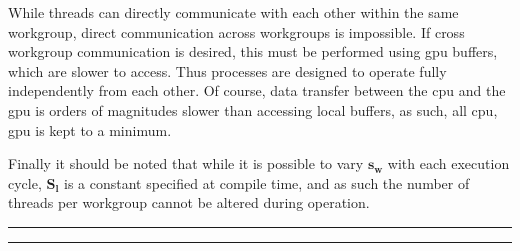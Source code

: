     While threads can directly communicate with each other within the same workgroup, direct communication across workgroups is
    impossible. If cross workgroup communication is desired, this must be performed using \ac{gpu} buffers, which are slower to access. Thus processes are
    designed to operate fully independently from each other. Of course, data transfer between the \ac{cpu} and the \ac{gpu} is orders of magnitudes
    slower than accessing local buffers, as such, all \ac{cpu}, \ac{gpu} is kept to a minimum.
    
    Finally it should be noted that while it is possible to vary \(\bm{s_w}\) with each execution cycle, \(\bm{S_l}\) is a constant specified at compile time,
    and as such the number of threads per workgroup cannot be altered during operation.

\bigskip
\bigskip
\hrule
\smallbreak
\hrule